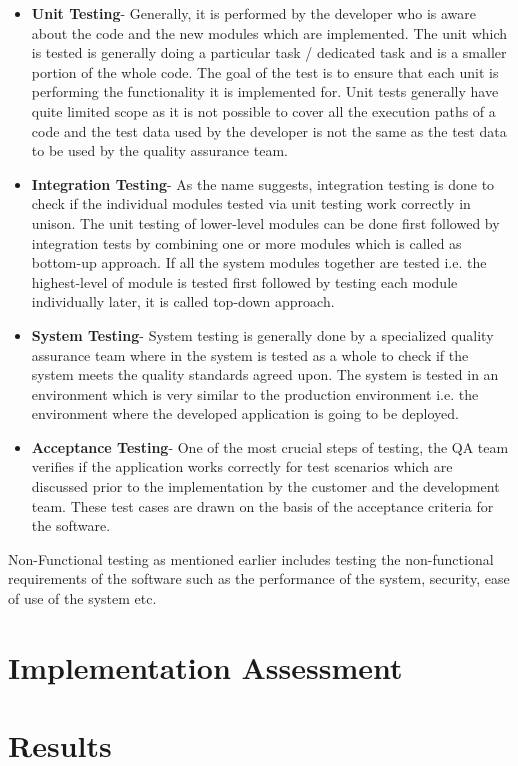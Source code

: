 \begin{itemize}
\item{\textbf{Unit Testing}}- Generally, it is performed by the developer who is aware about the code and the new modules which are implemented. The unit which is tested is generally doing a particular task / dedicated task and is a smaller portion of the whole code. The goal of the test is to ensure that each unit is performing the functionality it is implemented for. Unit tests generally have quite limited scope as it is not possible to cover all the execution paths of a code and the test data used by the developer is not the same as the test data to be used by the quality assurance team. 
\item{\textbf{Integration Testing}}- As the name suggests, integration testing is done to check if the individual modules tested via unit testing work correctly in unison. The unit testing of lower-level modules can be done first followed by integration tests by combining one or more modules which is called as bottom-up approach. If all the system modules together are tested i.e. the highest-level of module is tested first followed by testing each module individually later, it is called top-down approach.
\item{\textbf{System Testing}}- System testing is generally done by a specialized quality assurance team where in the system is tested as a whole to check if the system meets the quality standards agreed upon. The system is tested in an environment which is very similar to the production environment i.e. the environment where the developed application is going to be deployed.
\item{\textbf{Acceptance Testing}}- One of the most crucial steps of testing, the QA team verifies if the application works correctly for test scenarios which are discussed prior to the implementation by the customer and the development team. These test cases are drawn on the basis of the acceptance criteria for the software. 
\end{itemize}        

Non-Functional testing as mentioned earlier includes testing the non-functional requirements of the software such as the performance of the system, security, ease of use of the system etc. 

\section{Implementation Assessment}

\section{Results}